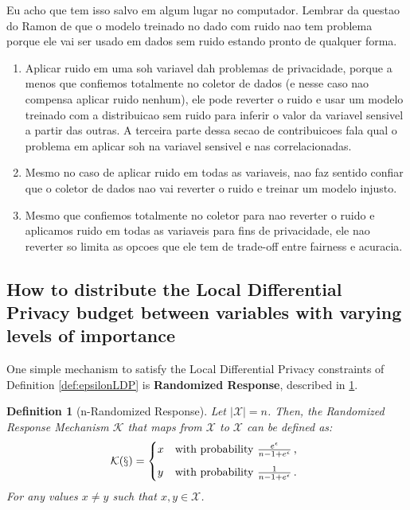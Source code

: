 \documentclass[conference]{IEEEtran}
\newtheorem{definition}{Definition}
\begin{document}
{\color{red} Eu acho que tem isso salvo em algum lugar no computador. Lembrar da questao do Ramon de que o modelo treinado no dado com ruido nao tem problema porque ele vai ser usado em dados sem ruido estando pronto de qualquer forma.}

{\color{red} \begin{enumerate}
	\item Aplicar ruido em uma soh variavel dah problemas de privacidade, porque a menos que confiemos totalmente no coletor de dados (e nesse caso nao compensa aplicar ruido nenhum), ele pode reverter o ruido e usar um modelo treinado com a distribuicao sem ruido para inferir o valor da variavel sensivel a partir das outras. A terceira parte dessa secao de contribuicoes fala qual o problema em aplicar soh na variavel sensivel e nas correlacionadas.
	\item Mesmo no caso de aplicar ruido em todas as variaveis, nao faz sentido confiar que o coletor de dados nao vai reverter o ruido e treinar um modelo injusto.
	\item Mesmo que confiemos totalmente no coletor para nao reverter o ruido e aplicamos ruido em todas as variaveis para fins de privacidade, ele nao reverter so limita as opcoes que ele tem de trade-off entre fairness e acuracia.
\end{enumerate}}

\subsection{How to distribute the Local Differential Privacy budget between variables with varying levels of importance}\label{subsec:ldpbudget}

One simple mechanism to satisfy the Local Differential Privacy constraints of Definition \ref{def:epsilonLDP} is \textbf{Randomized Response}, described in \ref{def:nrr}.

\begin{definition}[n-Randomized Response]\label{def:nrr} Let $|\mathcal{X}| = n$. Then, the Randomized Response Mechanism $\mathcal{K}$ that maps from $\mathcal{X}$ to $\mathcal{X}$ can be defined as:
	\[
	\mathcal{K(x)} = 
	\begin{dcases*}
		x
		& with probability $\frac{e^\epsilon}{n-1+e^\epsilon}$\,, \\[1ex]
		y 
	   	& with probability $\frac{1}{n-1+e^\epsilon}$\,.
	\end{dcases*}
	\]
For any values $x\neq y$ such that $x,y\in\mathcal{X}$.
\end{definition}
\end{document}
